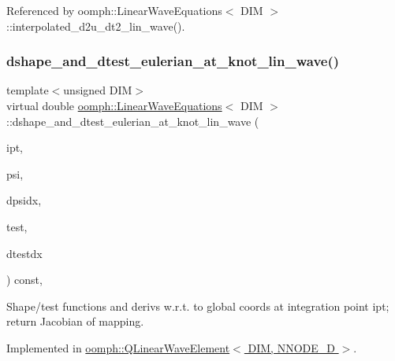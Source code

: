 Referenced by oomph\+::\+Linear\+Wave\+Equations$<$ D\+I\+M $>$\+::interpolated\+\_\+d2u\+\_\+dt2\+\_\+lin\+\_\+wave().

\mbox{\label{classoomph_1_1LinearWaveEquations_a8033ffc13e61d7adcd4b7e1154ea12af}} 
\subsubsection{\texorpdfstring{dshape\+\_\+and\+\_\+dtest\+\_\+eulerian\+\_\+at\+\_\+knot\+\_\+lin\+\_\+wave()}{dshape\_and\_dtest\_eulerian\_at\_knot\_lin\_wave()}}
{\footnotesize\ttfamily template$<$unsigned D\+IM$>$ \\
virtual double \hyperlink{classoomph_1_1LinearWaveEquations}{oomph\+::\+Linear\+Wave\+Equations}$<$ D\+IM $>$\+::dshape\+\_\+and\+\_\+dtest\+\_\+eulerian\+\_\+at\+\_\+knot\+\_\+lin\+\_\+wave (\begin{DoxyParamCaption}\item[{const unsigned \&}]{ipt,  }\item[{\hyperlink{classoomph_1_1Shape}{Shape} \&}]{psi,  }\item[{\hyperlink{classoomph_1_1DShape}{D\+Shape} \&}]{dpsidx,  }\item[{\hyperlink{classoomph_1_1Shape}{Shape} \&}]{test,  }\item[{\hyperlink{classoomph_1_1DShape}{D\+Shape} \&}]{dtestdx }\end{DoxyParamCaption}) const\hspace{0.3cm}{\ttfamily [protected]}, {}}



Shape/test functions and derivs w.\+r.\+t. to global coords at integration point ipt; return Jacobian of mapping. 



Implemented in \hyperlink{classoomph_1_1QLinearWaveElement_a96e8d0a3deace8fe691b5576607f1c0c}{oomph\+::\+Q\+Linear\+Wave\+Element$<$ D\+I\+M, N\+N\+O\+D\+E\+\_\+D $>$}.



